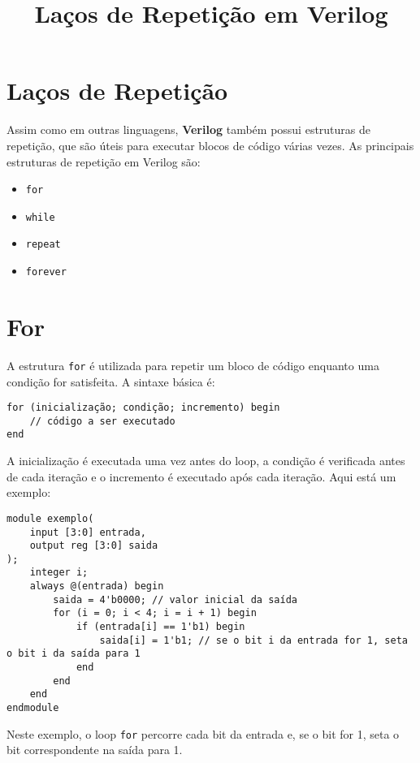\documentclass{article}
\title{Laços de Repetição em Verilog}
\date{}
\begin{document}
\maketitle

\section*{Laços de Repetição}

Assim como em outras linguagens, \textbf{Verilog} também possui estruturas de repetição, que são úteis para executar blocos de código várias vezes. As principais estruturas de repetição em Verilog são:

\begin{itemize}
  \item \texttt{for}
  \item \texttt{while}
  \item \texttt{repeat}
  \item \texttt{forever}
\end{itemize}

\section*{For}

A estrutura \texttt{for} é utilizada para repetir um bloco de código enquanto uma condição for satisfeita. A sintaxe básica é:

\begin{lstlisting}
for (inicialização; condição; incremento) begin
    // código a ser executado
end
\end{lstlisting}

A inicialização é executada uma vez antes do loop, a condição é verificada antes de cada iteração e o incremento é executado após cada iteração. Aqui está um exemplo:

\begin{lstlisting}
module exemplo(
    input [3:0] entrada,
    output reg [3:0] saida
);
    integer i;
    always @(entrada) begin
        saida = 4'b0000; // valor inicial da saída
        for (i = 0; i < 4; i = i + 1) begin
            if (entrada[i] == 1'b1) begin
                saida[i] = 1'b1; // se o bit i da entrada for 1, seta o bit i da saída para 1
            end
        end
    end
endmodule 
\end{lstlisting}

Neste exemplo, o loop \texttt{for} percorre cada bit da entrada e, se o bit for 1, seta o bit correspondente na saída para 1.
\end{document}
